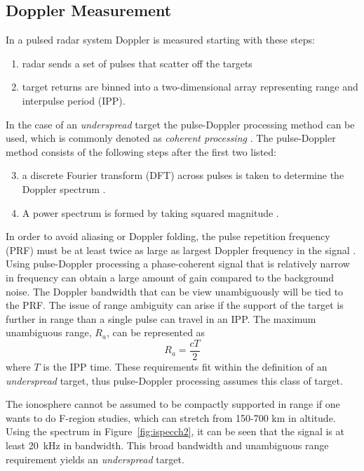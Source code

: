 \subsection{Doppler Measurement}
In a pulsed radar system Doppler is measured starting with these steps:
\begin{enumerate}
\label{list:uno}
\item radar sends a set of pulses that scatter off the targets 
\item target returns are binned into a two-dimensional array representing range and interpulse period (IPP).
\end{enumerate}
In the case of an \textit{underspread} target the pulse-Doppler processing method can be used, which is commonly denoted as \textit{coherent processing} \citep{richards2014fundamentals,richards2010principles,richards2014principles,skolnik2008radar}. The pulse-Doppler method consists of the following steps after the first two listed:
\begin{enumerate}
  \setcounter{enumi}{2}
  \item a discrete Fourier transform (DFT) across pulses is taken to determine the Doppler spectrum \citep{richards2014fundamentals}. 
\item A power spectrum is formed by taking squared magnitude .  
\end{enumerate}

In order to avoid aliasing or Doppler folding, the pulse repetition frequency (PRF) must be at least twice as large as largest Doppler frequency in the signal \citep{dtsp:openhiem}. 
Using pulse-Doppler processing a phase-coherent signal that is relatively narrow in frequency can obtain a large amount of gain compared to the background noise. The Doppler bandwidth that can be view unambiguously will be tied to the PRF. The issue of range ambiguity can arise if the support of the target is further in range than a single pulse can travel in an IPP. The maximum unambiguous range, $R_a$, can be represented as 
\begin{equation}
\label{eqn:maxuar}
R_a =  \frac{cT}{2}
\end{equation}
where $T$ is the IPP time. These requirements fit within the definition of an  \textit{underspread} target, thus pulse-Doppler processing assumes this class of target.

The ionosphere cannot be assumed to be compactly supported in range if one wants to do F-region studies, which can stretch from 150-700 km in altitude. 
Using the spectrum in Figure~\ref{fig:ispecch2}, it can be seen that the signal is at least 20~kHz in bandwidth.
This broad bandwidth and unambiguous range requirement yields an \textit{underspread} target. 

